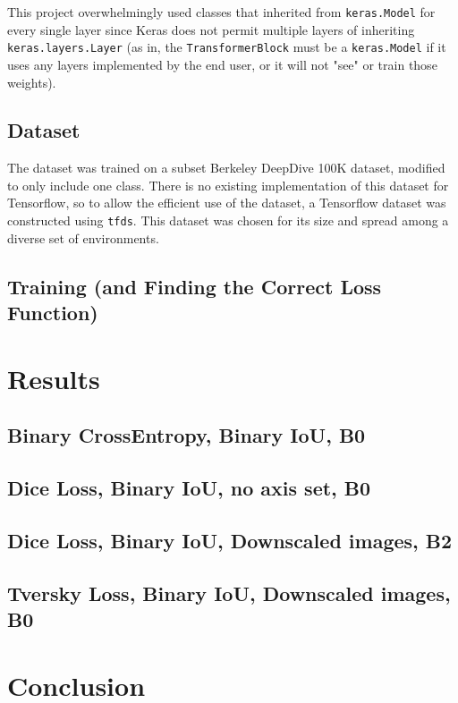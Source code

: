 \documentclass[12pt]{article}
\begin{document}
    This project overwhelmingly used classes that inherited from \texttt{keras.Model} for every single layer since Keras does not permit multiple layers of inheriting \texttt{keras.layers.Layer} (as in, the \texttt{TransformerBlock} must be a \texttt{keras.Model} if it uses any layers implemented by the end user, or it will not "see" or train those weights).


    \subsection*{Dataset}

    The dataset was trained on a subset Berkeley DeepDive 100K dataset, modified to only include one class. There is no existing implementation of this dataset for Tensorflow, so to allow the efficient use of the dataset, a Tensorflow dataset was constructed using \texttt{tfds}. This dataset was chosen for its size and spread among a diverse set of environments.

    \subsection*{Training (and Finding the Correct Loss Function)}

    \section{Results}

    \subsection*{Binary CrossEntropy, Binary IoU, B0}

    \subsection*{Dice Loss, Binary IoU, no axis set, B0}

    \subsection*{Dice Loss, Binary IoU, Downscaled images, B2}

    \subsection*{Tversky Loss, Binary IoU, Downscaled images, B0}

    \section{Conclusion}

    \newpage
    
\end{document}
